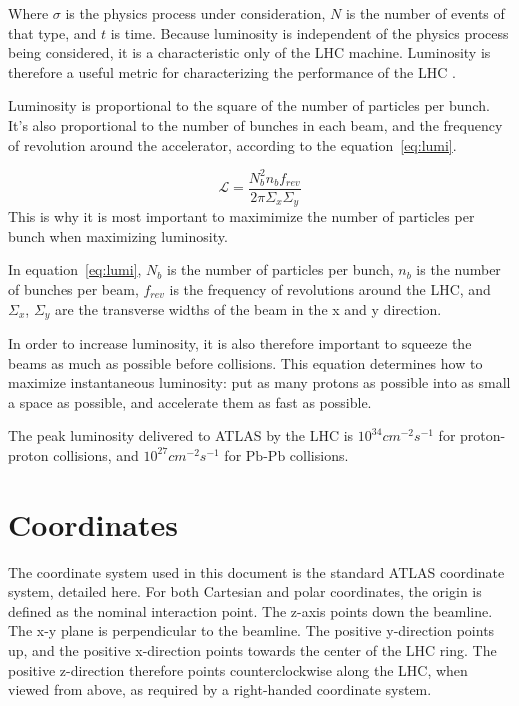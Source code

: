 Where $\sigma$ is the physics process under consideration, $N$ is the number of events of that type, and $t$ is time.
Because luminosity is independent of the physics process being considered, it is a characteristic only of the LHC machine.
Luminosity is therefore a useful metric for characterizing the performance of the LHC .

Luminosity is proportional to the square of the number of particles per bunch.
It's also proportional to the number of bunches in each beam, and the frequency of revolution around the accelerator,
according to the equation~\ref{eq:lumi}.

\begin{equation}\label{eq:lumi}
\mathcal{L} = \frac{N_b^2 n_b f_{rev}}{2\pi \Sigma_x \Sigma_y}
\end{equation}
This is why it is most important to maximimize the number of particles per bunch when maximizing luminosity.

In equation~\ref{eq:lumi}, $N_b$ is the number of particles per bunch, $n_b$ is the number of bunches per beam,
$f_{rev}$ is the frequency of revolutions around the LHC, and $\Sigma_x$, $\Sigma_y$ are the transverse widths of the beam in the
x and y direction.

In order to increase luminosity, it is also therefore important to squeeze the beams as much as possible before collisions.
This equation determines how to maximize instantaneous luminosity: put as many protons as possible into as small a space as possible,
and accelerate them as fast as possible.

The peak luminosity delivered to ATLAS by the LHC is $10^{34}cm^{-2}s^{-1}$ for proton-proton collisions,
and $10^{27}cm^{-2}s^{-1}$ for $\mathrm{Pb}$-$\mathrm{Pb}$ collisions.

\section{Coordinates}\label{sec:coordinates}
The coordinate system used in this document is the standard ATLAS coordinate system, detailed here.
For both Cartesian and polar coordinates, the origin is defined as the nominal interaction point.
The z-axis points down the beamline.
The x-y plane is perpendicular to the beamline.
The positive y-direction points up, and the positive x-direction points towards the center of the LHC ring.
The positive z-direction therefore points counterclockwise along the LHC, when viewed from above,
as required by a right-handed coordinate system.

